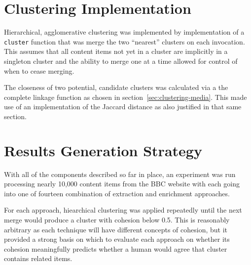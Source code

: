 \section{Clustering Implementation}

Hierarchical, agglomerative clustering was implemented by implementation
of a \texttt{cluster} function that was merge the two ``nearest''
clusters on each invocation. This assumes that all content items not
yet in a cluster are implicitly in a singleton cluster and the ability
to merge one at a time allowed for control of when to cease merging.

The closeness of two potential, candidate clusters was calculated via
a the complete linkage function as chosen in section~\ref{sec:clustering-media}.
This made use of an implementation of the Jaccard distance as also
justified in that same section.

\section{Results Generation Strategy}

With all of the components described so far in place, an experiment
was run processing nearly 10,000 content items from the BBC website
with each going into one of fourteen combination of extraction
and enrichment approaches.

For each approach, hiearchical clustering was applied repeatedly
until the next merge would produce a cluster with cohesion below 0.5.
This is reasonably arbitrary as each technique will have different
concepts of cohesion, but it provided a strong basis on which to
evaluate each approach on whether its cohesion meaningfully predicts
whether a human would agree that cluster contains related items.
